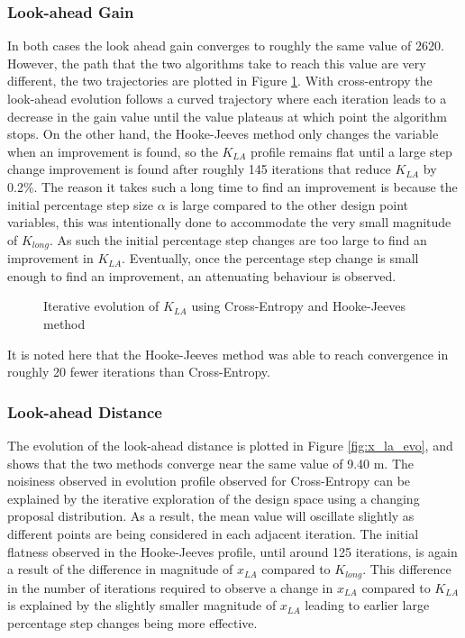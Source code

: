 \documentclass[conf]{new-aiaa}
\begin{document}
\subsubsection{Look-ahead Gain}
In both cases the look ahead gain converges to roughly the same value of 2620. However, the path that the two algorithms take to reach this value are very different, the two trajectories are plotted in Figure \ref{fig:k_la_evo}. 
With cross-entropy the look-ahead evolution follows a curved trajectory where each iteration leads to a decrease in the gain value until the value plateaus at which point the algorithm stops. 
On the other hand, the Hooke-Jeeves method only changes the variable when an improvement is found, so the $K_{LA}$ profile remains flat until a large step change improvement is found after roughly 145 iterations that reduce $K_{LA}$ by 0.2\%. The reason it takes such a long time to find an improvement is because the initial percentage step size $\alpha$ is large compared to the other design point variables, this was intentionally done to accommodate the very small magnitude of $K_{long}$. As such the initial percentage step changes are too large to find an improvement in $K_{LA}$. Eventually, once the percentage step change is small enough to find an improvement, an attenuating behaviour is observed. 

\begin{figure}[H]
    \begin{center}
        \vspace{-2.5mm}
        \resizebox{0.6\textwidth}{!}{}
        \vspace{-7.5mm}
    \end{center}
    \caption{Iterative evolution of $K_{LA}$ using Cross-Entropy and Hooke-Jeeves method}
    \label{fig:k_la_evo}
\end{figure}

It is noted here that the Hooke-Jeeves method was able to reach convergence in roughly 20 fewer iterations than Cross-Entropy.

\subsubsection{Look-ahead Distance}
The evolution of the look-ahead distance is plotted in Figure \ref{fig:x_la_evo}, and shows that the two methods converge near the same value of 9.40 m. The noisiness observed in evolution profile observed for Cross-Entropy can be explained by the iterative exploration of the design space using a changing proposal distribution. As a result, the mean value will oscillate slightly as different points are being considered in each adjacent iteration. The initial flatness observed in the Hooke-Jeeves profile, until around 125 iterations, is again a result of the difference in magnitude of $x_{LA}$ compared to $K_{long}$. This difference in the number of iterations required to observe a change in $x_{LA}$ compared to $K_{LA}$ is explained by the slightly smaller magnitude of $x_{LA}$ leading to earlier large percentage step changes being more effective.
\end{document}
